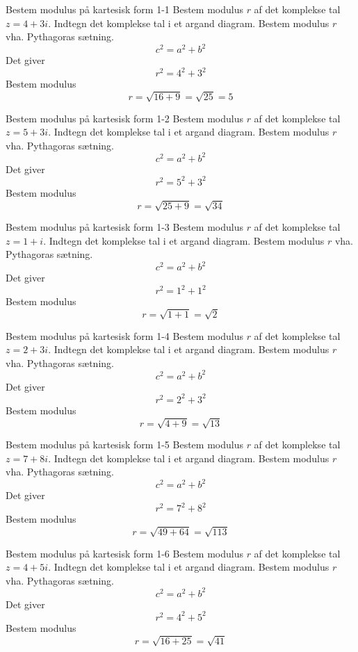 \documentclass{article}
\begin{document}
\tableofcontents
\newpage
\begin{exercise}{Bestem modulus på kartesisk form 1-1}
Bestem modulus $r$ af det komplekse tal $z = 4 + 3i$.
\hint
Indtegn det komplekse tal i et argand diagram.
\hint
Bestem modulus $r$ vha. Pythagoras sætning.
\[c^2 = a^2 + b^2
\]
\hint
Det giver
\[r^2 = 4^2 + 3^2
\]
\hint
Bestem modulus
\[r = \sqrt{16 + 9} = \sqrt{25} = 5
\]
\end{exercise}
\newpage
\begin{exercise}{Bestem modulus på kartesisk form 1-2}
Bestem modulus $r$ af det komplekse tal $z = 5 + 3i$.
\hint
Indtegn det komplekse tal i et argand diagram.
\hint
Bestem modulus $r$ vha. Pythagoras sætning.
\[c^2 = a^2 + b^2
\]
\hint
Det giver
\[r^2 = 5^2 + 3^2
\]
\hint
Bestem modulus
\[r = \sqrt{25 + 9} = \sqrt{34}
\]
\end{exercise}
\newpage
\begin{exercise}{Bestem modulus på kartesisk form 1-3}
Bestem modulus $r$ af det komplekse tal $z = 1 + i$.
\hint
Indtegn det komplekse tal i et argand diagram.
\hint
Bestem modulus $r$ vha. Pythagoras sætning.
\[c^2 = a^2 + b^2
\]
\hint
Det giver
\[r^2 = 1^2 + 1^2
\]
\hint
Bestem modulus
\[r = \sqrt{1 + 1} = \sqrt{2}
\]
\end{exercise}
\newpage
\begin{exercise}{Bestem modulus på kartesisk form 1-4}
Bestem modulus $r$ af det komplekse tal $z = 2 + 3i$.
\hint
Indtegn det komplekse tal i et argand diagram.
\hint
Bestem modulus $r$ vha. Pythagoras sætning.
\[c^2 = a^2 + b^2
\]
\hint
Det giver
\[r^2 = 2^2 + 3^2
\]
\hint
Bestem modulus
\[r = \sqrt{4 + 9} = \sqrt{13}
\]
\end{exercise}
\newpage
\begin{exercise}{Bestem modulus på kartesisk form 1-5}
Bestem modulus $r$ af det komplekse tal $z = 7 + 8i$.
\hint
Indtegn det komplekse tal i et argand diagram.
\hint
Bestem modulus $r$ vha. Pythagoras sætning.
\[c^2 = a^2 + b^2
\]
\hint
Det giver
\[r^2 = 7^2 + 8^2
\]
\hint
Bestem modulus
\[r = \sqrt{49 + 64} = \sqrt{113}
\]
\end{exercise}
\newpage
\begin{exercise}{Bestem modulus på kartesisk form 1-6}
Bestem modulus $r$ af det komplekse tal $z = 4 + 5i$.
\hint
Indtegn det komplekse tal i et argand diagram.
\hint
Bestem modulus $r$ vha. Pythagoras sætning.
\[c^2 = a^2 + b^2
\]
\hint
Det giver
\[r^2 = 4^2 + 5^2
\]
\hint
Bestem modulus
\[r = \sqrt{16 + 25} = \sqrt{41}
\]
\end{exercise}
\end{document}
